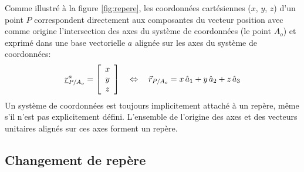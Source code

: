 Comme illustré à la figure \ref{fig:repere}, les coordonnées cartésiennes ($x$, $y$, $z$) d'un point $P$ correspondent directement aux composantes du vecteur position avec comme origine l'intersection des axes du système de coordonnées (le point $A_o$) et exprimé dans une base vectorielle $a$ alignée sur les axes du système de coordonnées:
\begin{align}
\underline{r}_{P/A_o}^a = \left[ \begin{array}{c} 
x \\ y \\ z
\end{array} \right]   \quad \Leftrightarrow \quad
\vec{r}_{P/A_o} = x \, \hat{a}_{1} + y \, \hat{a}_{2} + z \, \hat{a}_{3}
\end{align} 
Un système de coordonnées est toujours implicitement attaché à un repère, même s'il n'est pas explicitement défini. L'ensemble de l'origine des axes et des vecteurs unitaires alignés sur ces axes forment un repère. 



\subsection{Changement de repère}
\label{sec:repchan}

